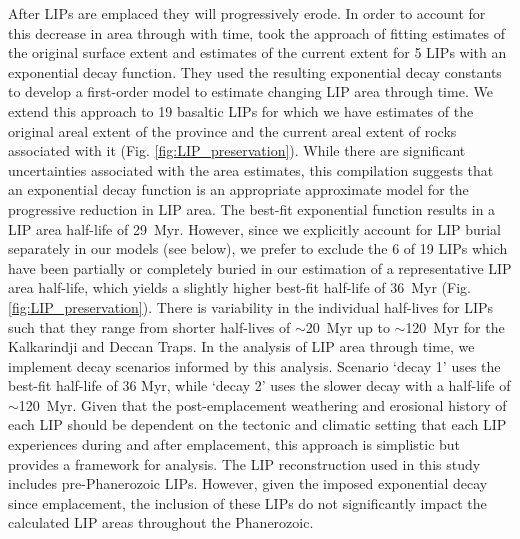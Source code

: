 \documentclass[11pt,letterpaper]{article}
\begin{document}
After LIPs are emplaced they will progressively erode. In order to account for this decrease in area through with time, \citet{Godderis2017a} took the approach of fitting estimates of the original surface extent and estimates of the current extent for 5 LIPs with an exponential decay function. They used the resulting exponential decay constants to develop a first-order model to estimate changing LIP area through time. We extend this approach to 19 basaltic LIPs for which we have estimates of the original areal extent of the province and the current areal extent of rocks associated with it (Fig. \ref{fig:LIP_preservation}). While there are significant uncertainties associated with the area estimates, this compilation suggests that an exponential decay function is an appropriate approximate model for the progressive reduction in LIP area. The best-fit exponential function results in a LIP area half-life of 29~Myr. However, since we explicitly account for LIP burial separately in our models (see below), we prefer to exclude the 6 of 19 LIPs which have been partially or completely buried in our estimation of a representative LIP area half-life, which yields a slightly higher best-fit half-life of 36~Myr (Fig. \ref{fig:LIP_preservation}). There is variability in the individual half-lives for LIPs such that they range from shorter half-lives of $\sim$20~Myr up to $\sim$120~Myr for the Kalkarindji and Deccan Traps. In the analysis of LIP area through time, we implement decay scenarios informed by this analysis. Scenario `decay 1' uses the best-fit half-life of 36 Myr, while `decay 2' uses the slower decay with a half-life of $\sim$120~Myr. Given that the post-emplacement weathering and erosional history of each LIP should be dependent on the tectonic and climatic setting that each LIP experiences during and after emplacement, this approach is simplistic but provides a framework for analysis. The LIP reconstruction used in this study includes pre-Phanerozoic LIPs. However, given the imposed exponential decay since emplacement, the inclusion of these LIPs do not significantly impact the calculated LIP areas throughout the Phanerozoic.
\end{document}
